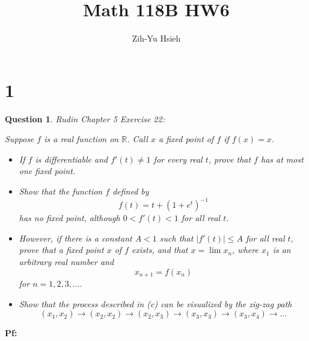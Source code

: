 \documentclass{article}
\title{Math 118B HW6}
\author{Zih-Yu Hsieh}
\newtheorem{question}{Question}
\begin{document}
\maketitle

\section*{1}
\begin{myBox}[]{}
    \begin{question}
        Rudin Chapter 5 Exercise 22:

        Suppose $f$ is a real function on $\mathbb{R}$. Call $x$ a \textit{fixed point} of $f$ if $f(x)=x$.
        \begin{itemize}
            \item[(a)] If $f$ is differentiable and $f'(t)\neq 1$ for every real $t$, prove that $f$ has at most one fixed point.
            \item[(b)] Show that the function $f$ defined by 
            $$f(t)=t+(1+e^t)^{-1}$$
            has no fixed point, although $0<f'(t)<1$ for all real $t$.
            \item[(c)] However, if there is a constant $A<1$ such that $|f'(t)|\leq A$ for all real $t$, prove that a fixed point $x$ of $f$ exists,
            and that $x=\lim x_n$, where $x_1$ is an arbitrary real number and
            $$x_{n+1}=f(x_n)$$
            for $n=1,2,3,....$
            \item[(d)] Show that the process described in (c) can be visualized by the zig-zag path
            $$(x_1,x_2)\rightarrow (x_2,x_2)\rightarrow (x_2,x_3)\rightarrow (x_3,x_3)\rightarrow (x_3,x_4)\rightarrow ...$$
        \end{itemize}
    \end{question}
\end{myBox}

\textbf{Pf:}
\end{document}
